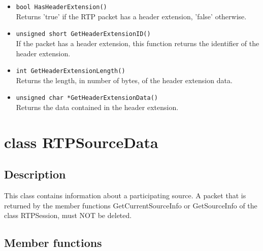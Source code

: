 \begin{itemize}
\item {\tt bool HasHeaderExtension()}\\
 	Returns 'true' if the RTP packet has a header extension, 'false'
 	otherwise.

\item {\tt unsigned short GetHeaderExtensionID()}\\
	If the packet has a header extension, this function returns the
	identifier of the header extension.

\item {\tt int GetHeaderExtensionLength()}\\
 	Returns the length, in number of bytes, of the header extension
 	data.

\item {\tt unsigned char *GetHeaderExtensionData()}\\
 	Returns the data contained in the header extension.


\end{itemize}
 	

\section{class RTPSourceData}

\subsection{Description}

This class contains information about a participating source. A packet that
is returned by the member functions GetCurrentSourceInfo or GetSourceInfo
of the class RTPSession, must NOT be deleted.

\subsection{Member functions}

